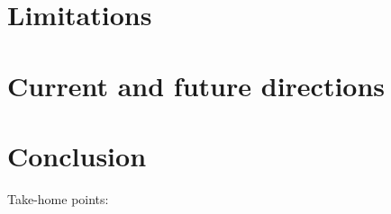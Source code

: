 \section{Limitations}\label{ch5:sec:limitations}


\section{Current and future directions}\label{ch5:sec:directions}

\section{Conclusion}\label{ch5:sec:conclusion}Take-home points:


\endinput %
